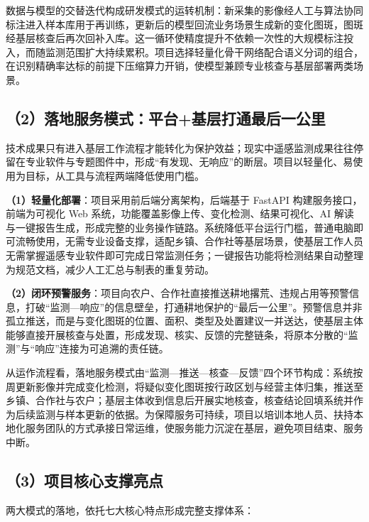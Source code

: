 \documentclass[12pt, a4paper]{ctexart}
\begin{document}
数据与模型的交替迭代构成研发模式的运转机制：新采集的影像经人工与算法协同标注进入样本库用于再训练，更新后的模型回流业务场景生成新的变化图斑，图斑经基层核查后再次回补入库。这一循环使精度提升不依赖一次性的大规模标注投入，而随监测范围扩大持续累积。项目选择轻量化骨干网络配合语义分词的组合，在识别精确率达标的前提下压缩算力开销，使模型兼顾专业核查与基层部署两类场景。

\subsection{（2）落地服务模式：平台+基层打通最后一公里}

技术成果只有进入基层工作流程才能转化为保护效益；现实中遥感监测成果往往停留在专业软件与专题图件中，形成“有发现、无响应”的断层。项目以轻量化、易使用为目标，从工具与流程两端降低使用门槛。

\textbf{（1）轻量化部署}：项目采用前后端分离架构，后端基于 FastAPI 构建服务接口，前端为可视化 Web 系统，功能覆盖影像上传、变化检测、结果可视化、AI 解读与一键报告生成，形成完整的业务操作链路。系统降低平台运行门槛，普通电脑即可流畅使用，无需专业设备支撑，适配乡镇、合作社等基层场景，使基层工作人员无需掌握遥感专业软件即可完成日常监测任务；一键报告功能将检测结果自动整理为规范文档，减少人工汇总与制表的重复劳动。

\textbf{（2）闭环预警服务}：项目向农户、合作社直接推送耕地撂荒、违规占用等预警信息，打破“监测—响应”的信息壁垒，打通耕地保护的“最后一公里”。预警信息并非孤立推送，而是与变化图斑的位置、面积、类型及处置建议一并送达，使基层主体能够直接开展核查与处置，形成发现、核实、反馈的完整链条，将原本分散的“监测”与“响应”连接为可追溯的责任链。

从运作流程看，落地服务模式由“监测—推送—核查—反馈”四个环节构成：系统按周更新影像并完成变化检测，将疑似变化图斑按行政区划与经营主体归集，推送至乡镇、合作社与农户；基层主体收到信息后开展实地核查，核查结论回填系统并作为后续监测与样本更新的依据。为保障服务可持续，项目以培训本地人员、扶持本地化服务团队的方式承接日常运维，使服务能力沉淀在基层，避免项目结束、服务中断。

\subsection{（3）项目核心支撑亮点}

两大模式的落地，依托七大核心特点形成完整支撑体系：
\end{document}
